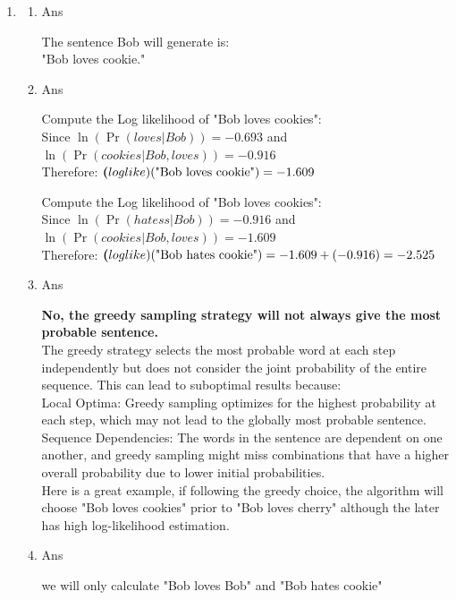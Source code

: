 \documentclass[12pt]{article}
\begin{document}
\begin{enumerate}
\item
\begin{enumerate}

\item Ans
\begin{tcolorbox}
The sentence Bob will generate is: \\
"Bob loves cookie."
\end{tcolorbox}
\item Ans
\begin{tcolorbox}
    Compute the Log likelihood of "Bob loves cookies":\\
    Since \(\ln(\Pr(loves | Bob)) = -0.693 \) and \(\ln(\Pr(cookies | Bob, loves)) = -0.916 \) \\
    Therefore: \(\textbf(loglike)(\text{"Bob loves cookie"}) = -1.609\)
    
    Compute the Log likelihood of "Bob loves cookies":\\
    Since \(\ln(\Pr(hatess | Bob)) = -0.916 \) and \(\ln(\Pr(cookies | Bob, loves)) = - 1.609\) \\
    Therefore: \(\textbf(loglike)(\text{"Bob hates cookie"}) = -1.609 + (-0.916) = -2.525\)
\end{tcolorbox}
\item Ans
\begin{tcolorbox}
    \textbf{No, the greedy sampling strategy will not always give the most probable sentence.}\\
    The greedy strategy selects the most probable word at each step independently but does not consider the joint probability of the entire sequence. This can lead to suboptimal results because: \\
    Local Optima: Greedy sampling optimizes for the highest probability at each step, which may not lead to the globally most probable sentence.\\
    Sequence Dependencies: The words in the sentence are dependent on one another, and greedy sampling might miss combinations that have a higher overall probability due to lower initial probabilities.\\
    
    Here is a great example, if following the greedy choice, the algorithm will choose "Bob loves cookies" prior to "Bob loves cherry" although the later has high log-likelihood estimation.
\end{tcolorbox}
\item Ans
\begin{tcolorbox}
    we will only calculate "Bob loves Bob" and "Bob hates cookie" \\
     

\end{tcolorbox}
\end{enumerate}
\end{enumerate}
\end{document}
